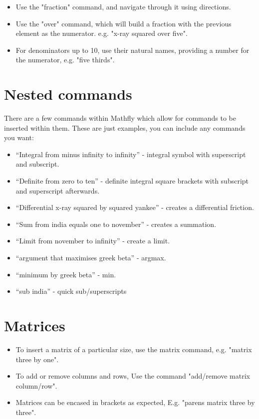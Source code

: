\documentclass[12pt]{article}
\begin{document}
\begin{itemize}
\item Use the "fraction" command, and navigate through it using directions.
\item Use the "over" command, which will build a fraction with the previous element as the numerator. e.g. "x-ray squared over five".
\item For denominators up to 10, use their natural names, providing a number for the numerator, e.g. "five thirds".
\end{itemize}

\section{Nested commands}
There are a few commands within Mathfly which allow for commands to be inserted within them. These are just examples, you can include any commands you want:
\begin{itemize}
\item ``Integral from minus infinity to infinity'' - integral symbol with superscript and subscript.
\item ``Definite from zero to ten'' - definite integral square brackets with subscript and superscript afterwards.
\item ``Differential x-ray squared by squared yankee'' - creates a differential friction.
\item ``Sum from india equals one to november'' - creates a summation.
\item ``Limit from november to infinity'' - create a limit.
\item ``argument that maximises greek beta'' - argmax.
\item ``minimum by greek beta'' - min.
\item ``sub india'' - quick sub/superscripts
\end{itemize}

\section{Matrices}
\begin{itemize}
\item To insert a matrix of a particular size, use the matrix command, e.g. "matrix three by one".
\item To add or remove columns and rows, Use the command "add/remove matrix column/row".
\item Matrices can be encased in brackets as expected, E.g. "parens matrix three by three".
\end{itemize}
\end{document}
